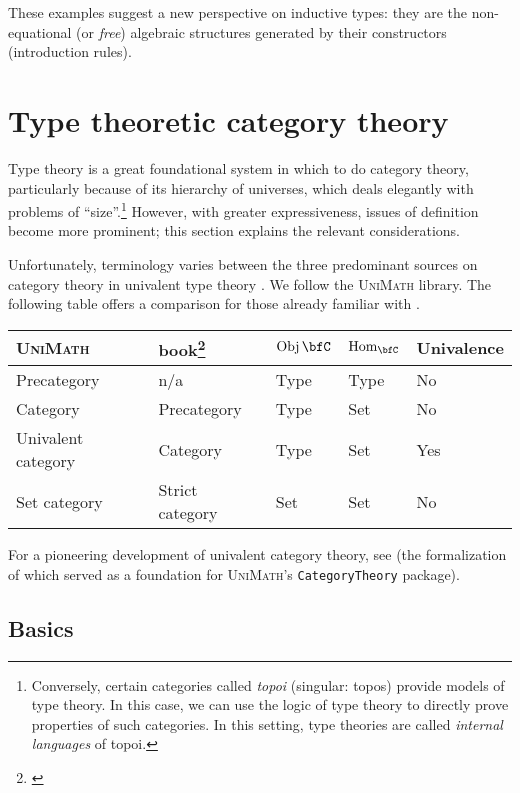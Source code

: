 \documentclass[a5paper]{article}
\newcommand{\software}[1]{{\textsc{#1}}\index{#1}}
\newcommand{\UniMath}{\software{UniMath}}
\begin{document}
These examples suggest a new perspective on inductive types: they are the
non-equational (or \textit{free}) algebraic structures generated by their
constructors (introduction rules). 

\section{Type theoretic category theory}
\label{sec:type-theoretic-category-theory}

Type theory is a great foundational system in which to do category theory,
particularly because of its hierarchy of universes, which deals elegantly with
problems of ``size''.\footnote{
  Conversely, certain categories called \textit{topoi} (singular: topos) provide
  models of type theory. In this case, we can use the logic of type theory to
  directly prove properties of such categories. In this setting, type theories
  are called \textit{internal languages} of topoi.} However, with greater
expressiveness,
issues of definition become more prominent; this section explains the relevant
considerations.

Unfortunately, terminology varies between the three predominant sources on
category theory in univalent type theory \cite{book} \cite{unimath}
\cite{hott-lib}. We follow the \UniMath{} library. The
following table offers a comparison for those already familiar with \cite{book}.
\begin{center}
  \begin{tabular}{| l | l | l | l | l |}
    \hline
    \UniMath{} & \HoTT{} book\footnote{\cite{book}} & $\Obj\bfC$ & $\Hom_{\bfC}$ & Univalence \\ \hline
    Precategory                  & n/a             & Type & Type  & No \\
    Category                     & Precategory     & Type & Set   & No \\
    Univalent category           & Category        & Type & Set   & Yes \\
    Set category                 & Strict category & Set  & Set   & No \\
    \hline
  \end{tabular}
\end{center}
For a pioneering development of univalent category theory, see \cite{rezk} (the
formalization of which served as a foundation for \UniMath{}'s
\texttt{CategoryTheory} package). 

\subsection{Basics}
\label{subsec:basics}
\end{document}
